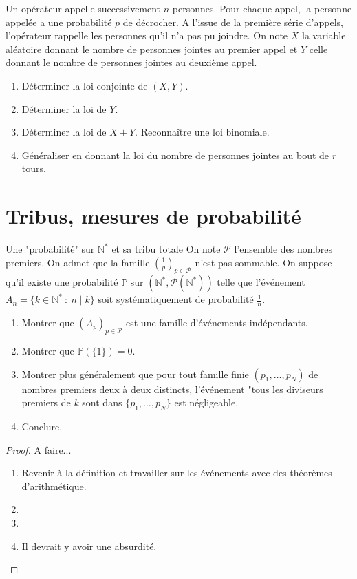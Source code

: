 \documentclass[french,a4paper]{article}
\renewcommand{\P}{\mathbb{P}}
\newcommand{\N}{\mathbb{N}}
\newcommand{\st}{^*}
\theoremstyle{plain}
\theoremstyle{definition}
\theoremstyle{remark}
\begin{document}
\begin{ex}{}
	Un opérateur appelle successivement $n$ personnes. Pour chaque appel, la personne appelée a une probabilité $p$ de décrocher. A l'issue de la première série d'appels, l'opérateur rappelle les personnes qu'il n'a pas pu joindre. On note $X$ la variable aléatoire donnant le nombre de personnes jointes au premier appel et $Y$ celle donnant le nombre de personnes jointes au deuxième appel.
	\begin{enumerate}
		\item Déterminer la loi conjointe de $(X,Y)$.
		\item Déterminer la loi de $Y$.
		\item Déterminer la loi de $X+Y$. Reconnaître une loi binomiale.
		\item Généraliser en donnant la loi du nombre de personnes jointes au bout de $r$ tours.
	\end{enumerate}
\end{ex}

\section{Tribus, mesures de probabilité}

\begin{ex}{Une "probabilité" sur $\N\st$ et sa tribu totale}
	On note $\mathcal{P}$ l'ensemble des nombres premiers. On admet que la famille $\displaystyle\left(\frac{1}{p}\right)_{p\in\mathcal{P}}$ n'est pas sommable. On suppose qu'il existe une probabilité $\P$ sur $(\N\st,\mathcal{P}(\N\st))$ telle que l'événement $A_n=\{k\in\N\st\ : \ n\mid k\}$ soit systématiquement de probabilité $\displaystyle\frac{1}{n}$.
	\begin{enumerate}
		\item Montrer que $(A_p)_{p\in\mathcal{P}}$ est une famille d'événements indépendants.
		\item Montrer que $\P(\{1\})=0$.
		\item Montrer plus généralement que pour tout famille finie $(p_1,\ldots,p_N)$ de nombres premiers deux à deux distincts, l'événement "tous les diviseurs premiers de $k$ sont dans $\{p_1,\ldots,p_N\}$ est négligeable.
		\item Conclure.
	\end{enumerate}
\end{ex}
\begin{proof}
	A faire...
	\begin{enumerate}
		\item Revenir à la définition et travailler sur les événements avec des théorèmes d'arithmétique.
		\item 
		\item 
		\item Il devrait y avoir une absurdité.
	\end{enumerate}
\end{proof}
\end{document}
